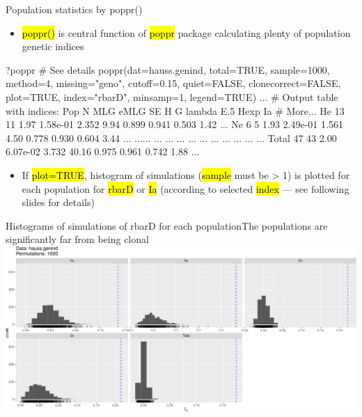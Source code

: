 \documentclass[compress, ucs, xelatex, 11pt, xcolor=svgnames,
  hyperref={
    bookmarks=true,
    unicode=true,
    colorlinks=true,
    pdftitle={Molecular data in R},
    plainpages=false,
    pdfauthor={Vojtech Zeisek},
    pdfsubject={Course about phylogeny and evolution in R},
    pdfcreator={XeLaTeX},
    pdfkeywords={R, evolution, phylogeny, molecular data},
    linkcolor=Tomato,
    anchorcolor=SaddleBrown,
    citecolor=Goldenrod,
    filecolor=DarkMagenta,
    menucolor=Sienna,
    urlcolor=DarkTurquoise,
    pdftex},
  url={hyphens, lowtilde} %
  ]{beamer}
\renewcommand{\texttt}[1]{\hl{\ttfamily #1}}
\begin{document}
\begin{frame}[fragile]{Population statistics by poppr()}
  \vfill
  \begin{itemize}
    \item \texttt{poppr()} is central function of \texttt{poppr} package calculating plenty of population genetic indices
  \end{itemize}
  \vfill
  \begin{spluscode}
    ?poppr # See details
    poppr(dat=hauss.genind, total=TRUE, sample=1000, method=4,
      missing="geno", cutoff=0.15, quiet=FALSE, clonecorrect=FALSE,
      plot=TRUE, index="rbarD", minsamp=1, legend=TRUE)
    ... # Output table with indices:
      Pop  N MLG eMLG       SE     H     G lambda   E.5  Hexp   Ia # More...
       He 13  11 1.97 1.58e-01 2.352  9.94  0.899 0.941 0.503 1.42 ...
       Ne  6   5 1.93 2.49e-01 1.561  4.50  0.778 0.930 0.604 3.44 ...
      ...... ...  ...      ...   ...   ...    ...   ...   ...  ... ...
    Total 47  43 2.00 6.07e-02 3.732 40.16  0.975 0.961 0.742 1.88 ...
  \end{spluscode}
  \vfill
  \begin{itemize}
    \item If \texttt{plot=TRUE}, histogram of simulations (\texttt{sample} must be > 1) is plotted for each population for \texttt{rbarD} or \texttt{Ia} (according to selected \texttt{index} --- see following slides for details)
  \end{itemize}
  \vfill
\end{frame}

\begin{frame}{Histograms of simulations of rbarD for each population}{The populations are significantly far from being clonal}
  \includegraphics[width=\textwidth]{poppr.png}
\end{frame}
\end{document}
